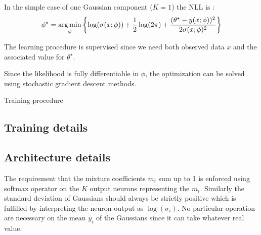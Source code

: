 In the simple case of one Gaussian component ($K=1$) the NLL is :
\begin{equation}
    \phi^\star = \operatorname*{arg\,min}_\phi \left\{ \log(\sigma(x;\phi)) + \frac{1}{2}\log(2\pi) + \frac{(\theta^\star - y(x;\phi))^2}{2\sigma(x;\phi)^2} \right\}
\end{equation}

The learning procedure is supervised since we need both observed data $x$ and the associated value for  $\theta^\star$.

Since the likelihood is fully differentiable in $\phi$, the optimization can be solved using stochastic gradient descent methods.

\begin{algorithm}[H]
 \caption{Training procedure}
\end{algorithm}







\subsection{Training details} %
\label{sub:training_details}




\subsection{Architecture details} %
\label{sub:architecture_details}



The requirement that the mixture coefficients $m_i$ sum up to 1 is enforced using softmax operator on the $K$ output neurons representing the $m_i$.
Similarly the standard deviation of Gaussians should always be strictly positive which is fulfilled by interpreting the neuron output as $\log(\sigma_i)$.
No particular operation are necessary on the mean $y_i$ of the Gaussians since it can take whatever real value.









